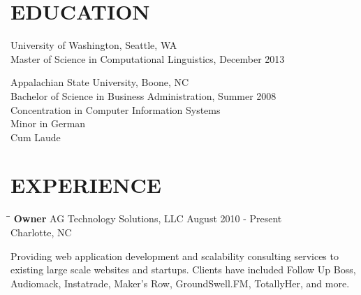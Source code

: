 \documentclass{res}
\begin{document}
\address{\large\bf  Anthony Gentile}
\address{6932 Loretta Place \\  Charlotte, NC 28215 \\  (704) 657-8550 \\ asgentile@gmail.com}

\begin{resume}

\section{EDUCATION}
    University of Washington, Seattle, WA  \\
    Master of Science in Computational Linguistics, December 2013

    Appalachian State University, Boone, NC  \\
    Bachelor of Science in Business Administration, Summer 2008   \\
    Concentration in Computer Information Systems       \\
    Minor in German  \\
    Cum Laude

\section{EXPERIENCE}
   \vspace{-0.1in}
   \begin{tabbing}
   \hspace{2.3in}\= \hspace{2.6in}\= \kill %
    {\bf Owner} \>AG Technology Solutions, LLC     \> August 2010 - Present\\
                             \>Charlotte, NC
   \end{tabbing}\vspace{-5pt}      %
    Providing web application development and scalability consulting services to existing large scale websites and startups. Clients have included Follow Up Boss, Audiomack, Instatrade, Maker's Row, GroundSwell.FM, TotallyHer, and more.


\end{resume}
\end{document}
